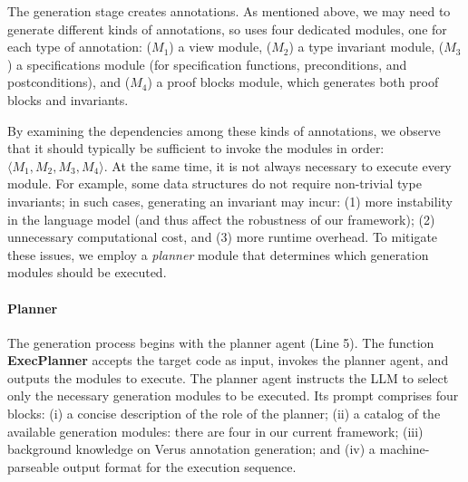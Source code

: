 The generation stage creates annotations. As mentioned above, we may need to generate different kinds of annotations, so \toolname{} uses four dedicated modules, one for each type of annotation: ($M_1$) a view module, ($M_2$) a {type invariant} module, ($M_3$) a specifications module (for specification functions, preconditions, and postconditions), and ($M_4$) a {proof blocks} module, which generates both proof blocks and invariants.


By examining the dependencies among these kinds of annotations, we observe that it should typically be sufficient to invoke the modules in order: $\langle M_1, M_2, M_3, M_4\rangle$. At the same time, it is not always necessary to execute every module. For example, some data structures do not require non-trivial type invariants; in such cases, generating an invariant may incur: (1) more instability in the language model (and thus affect the robustness of our framework); (2) unnecessary computational cost, and (3) more runtime overhead. To mitigate these issues, we employ a \emph{planner} module that determines which generation modules should be executed.

\paragraph{Planner} The generation process begins with the planner agent (Line 5). The function \textbf{ExecPlanner} accepts the target code as input, invokes the planner agent, and outputs the modules to execute.
The planner agent instructs the LLM to select only the necessary generation modules to be executed. Its prompt comprises four blocks: (i) a concise description of the role of the planner; (ii) a catalog of the available generation modules: there are four in our current framework; (iii) background knowledge on Verus annotation generation; and (iv) a machine-parseable output format for the execution sequence.


